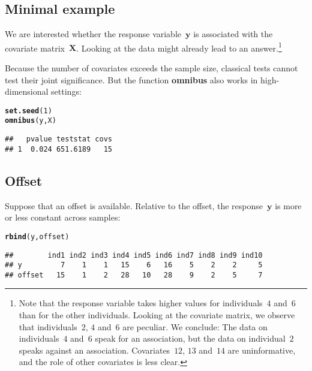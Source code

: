 \documentclass{article}\usepackage[]{graphicx}\usepackage[]{color}
\makeatletter
\newcommand{\hlnum}[1]{\textcolor[rgb]{0.686,0.059,0.569}{#1}}%
\newcommand{\hlstd}[1]{\textcolor[rgb]{0.345,0.345,0.345}{#1}}%
\newcommand{\hlkwd}[1]{\textcolor[rgb]{0.737,0.353,0.396}{\textbf{#1}}}%
\newenvironment{kframe}{%
 \def\at@end@of@kframe{}%
 \ifinner\ifhmode%
  \def\at@end@of@kframe{\end{minipage}}%
  \begin{minipage}{\columnwidth}%
 \fi\fi%
 \def\FrameCommand##1{\hskip\@totalleftmargin \hskip-\fboxsep
 \colorbox{shadecolor}{##1}\hskip-\fboxsep
     \hskip-\linewidth \hskip-\@totalleftmargin \hskip\columnwidth}%
 \MakeFramed {\advance\hsize-\width
   \@totalleftmargin\z@ \linewidth\hsize
   \@setminipage}}%
 {\par\unskip\endMakeFramed%
 \at@end@of@kframe}
\newenvironment{knitrout}{}{} %
\makeatother
\begin{document}
\subsection{Minimal example}
\label{TOA Minimal example}

We are interested whether the response variable~$\boldsymbol{y}$ is associated with the covariate matrix~$\boldsymbol{X}$. Looking at the data might already lead to an answer.\footnote{Note that the response variable takes higher values for individuals~$4$ and~$6$ than for the other individuals. Looking at the covariate matrix, we observe that individuals~$2$, $4$ and~$6$ are peculiar.
We conclude: The data on individuals~$4$ and~$6$ speak for an association, but the data on individual~$2$ speaks against an association. Covariates~$12$, $13$ and~$14$ are uninformative, and the role of other covariates is less clear.}

Because the number of covariates exceeds the sample size, classical tests cannot test their joint significance. But the function \textbf{omnibus} also works in high-dimensional settings:
\begin{knitrout}
\color{fgcolor}\begin{kframe}
\begin{alltt}
\hlkwd{set.seed}\hlstd{(}\hlnum{1}\hlstd{)}
\hlkwd{omnibus}\hlstd{(y,X)}
\end{alltt}
\begin{verbatim}
##   pvalue teststat covs
## 1  0.024 651.6189   15
\end{verbatim}
\end{kframe}
\end{knitrout}

\newpage

\subsection{Offset}
\label{TOA Offset}

Suppose that an offset is available. Relative to the offset, the response~$\boldsymbol{y}$ is more or less constant across samples:
\begin{knitrout}
\color{fgcolor}\begin{kframe}
\begin{alltt}
\hlkwd{rbind}\hlstd{(y,offset)}
\end{alltt}
\begin{verbatim}
##        ind1 ind2 ind3 ind4 ind5 ind6 ind7 ind8 ind9 ind10
## y         7    1    1   15    6   16    5    2    2     5
## offset   15    1    2   28   10   28    9    2    5     7
\end{verbatim}
\end{kframe}
\end{knitrout}
\end{document}
